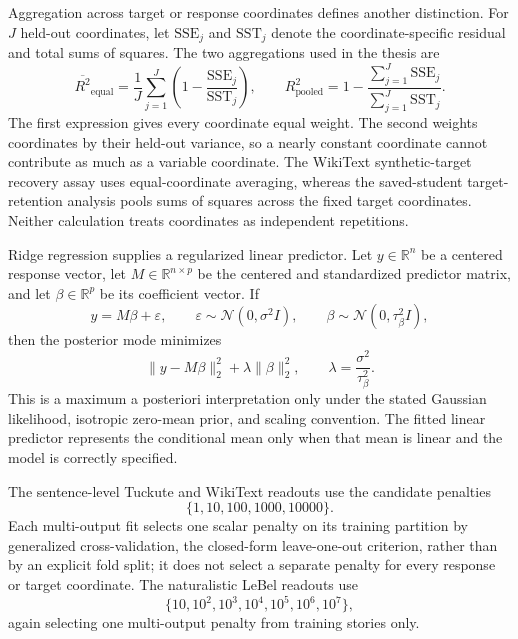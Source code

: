 Aggregation across target or response coordinates defines another distinction.
For \(J\) held-out coordinates, let \(\mathrm{SSE}_j\) and \(\mathrm{SST}_j\) denote the coordinate-specific residual and total sums of squares.
The two aggregations used in the thesis are
\begin{equation}
  \overline{R^2}_{\mathrm{equal}}
  =
  \frac{1}{J}\sum_{j=1}^{J}
  \left(1-\frac{\mathrm{SSE}_j}{\mathrm{SST}_j}\right),
  \qquad
  R^2_{\mathrm{pooled}}
  =
  1-\frac{\sum_{j=1}^{J}\mathrm{SSE}_j}
           {\sum_{j=1}^{J}\mathrm{SST}_j}.
  \label{eq:coordinate-aggregation}
\end{equation}
The first expression gives every coordinate equal weight.
The second weights coordinates by their held-out variance, so a nearly constant coordinate cannot contribute as much as a variable coordinate.
The WikiText synthetic-target recovery assay uses equal-coordinate averaging, whereas the saved-student target-retention analysis pools sums of squares across the fixed target coordinates.
Neither calculation treats coordinates as independent repetitions. 

Ridge regression supplies a regularized linear predictor.
Let \(y\in\mathbb R^n\) be a centered response vector, let \(M\in\mathbb R^{n\times p}\) be the centered and standardized predictor matrix, and let \(\beta\in\mathbb R^p\) be its coefficient vector.
If
\[
  y=M\beta+\varepsilon,
  \qquad
  \varepsilon\sim\mathcal N(0,\sigma^2I),
  \qquad
  \beta\sim\mathcal N(0,\tau_\beta^2I),
\]
then the posterior mode minimizes
\[
  \lVert y-M\beta\rVert_2^2
  +
  \lambda\lVert\beta\rVert_2^2,
  \qquad
  \lambda=\frac{\sigma^2}{\tau_\beta^2}.
\]
This is a maximum a posteriori interpretation only under the stated Gaussian likelihood, isotropic zero-mean prior, and scaling convention.
The fitted linear predictor represents the conditional mean only when that mean is linear and the model is correctly specified.

The sentence-level Tuckute and WikiText readouts use the candidate penalties
\[
\{1,10,100,1000,10000\}.
\]
Each multi-output fit selects one scalar penalty on its training partition by generalized cross-validation, the closed-form leave-one-out criterion, rather than by an explicit fold split; it does not select a separate penalty for every response or target coordinate.
The naturalistic LeBel readouts use
\[
\{10,10^2,10^3,10^4,10^5,10^6,10^7\},
\]
again selecting one multi-output penalty from training stories only.

